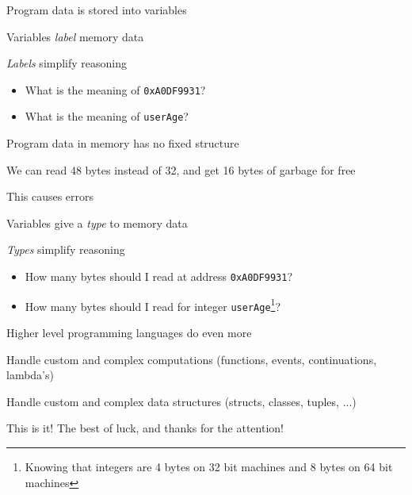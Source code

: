 \documentclass{beamer}
\begin{document}
\begin{slide}{
\item Program data is stored into variables
\item Variables \textit{label} memory data
\item \textit{Labels} simplify reasoning
\pause
\begin{itemize}
\item What is the meaning of \texttt{0xA0DF9931}?
\pause
\item What is the meaning of \texttt{userAge}?
\end{itemize}
}\end{slide}

\begin{slide}{
\item Program data in memory has no fixed structure
\item We can read 48 bytes instead of 32, and get 16 bytes of garbage for free
\item This causes errors
}\end{slide}

\begin{slide}{
\item Variables give a \textit{type} to memory data
\item \textit{Types} simplify reasoning
\pause
\begin{itemize}
\item How many bytes should I read at address \texttt{0xA0DF9931}?
\pause
\item How many bytes should I read for integer \texttt{userAge}\footnote{Knowing that integers are 4 bytes on 32 bit machines and 8 bytes on 64 bit machines}?
\end{itemize}
}\end{slide}

\begin{slide}{
\item Higher level programming languages do even more
\item Handle custom and complex computations (functions, events, continuations, lambda's)
\item Handle custom and complex data structures (structs, classes, tuples, ...)
}\end{slide}



\begin{frame}{This is it!}
\center
\fontsize{18pt}{7.2}\selectfont
The best of luck, and thanks for the attention!
\end{frame}
\end{document}

